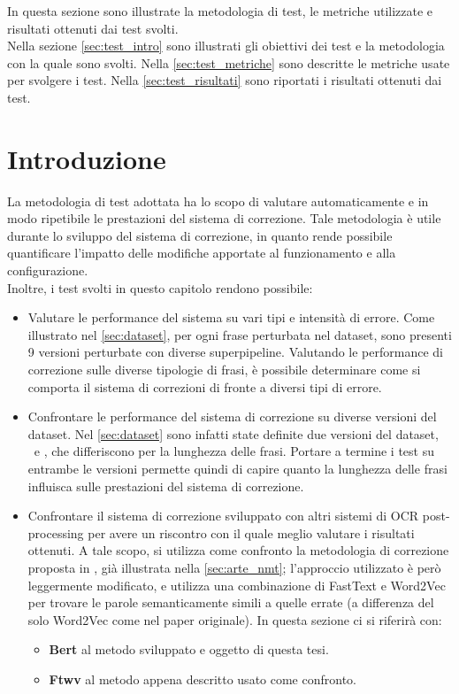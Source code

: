 In questa sezione sono illustrate la metodologia di test, le metriche utilizzate e risultati ottenuti dai test svolti.\\
Nella sezione \autoref{sec:test_intro} sono illustrati gli obiettivi dei test e la metodologia con la quale sono svolti. Nella \autoref{sec:test_metriche} sono descritte le metriche usate per svolgere i test. Nella \autoref{sec:test_risultati} sono riportati i risultati ottenuti dai test.

\section{Introduzione}
\label{sec:test_intro}
La metodologia di test adottata ha lo scopo di valutare automaticamente e in modo ripetibile le prestazioni del sistema di correzione. Tale metodologia è utile durante lo sviluppo del sistema di correzione, in quanto rende possibile quantificare l'impatto delle modifiche apportate al funzionamento e alla configurazione.\\
Inoltre, i test svolti in questo capitolo rendono possibile:
\begin{itemize}
\item Valutare le performance del sistema su vari tipi e intensità di errore. Come illustrato nel \autoref{sec:dataset}, per ogni frase perturbata nel dataset, sono presenti 9 versioni perturbate con diverse superpipeline. Valutando le performance di correzione sulle diverse tipologie di frasi, è possibile determinare come si comporta il sistema di correzioni di fronte a diversi tipi di errore.

\item Confrontare le performance del sistema di correzione su diverse versioni del dataset. Nel \autoref{sec:dataset} sono infatti state definite due versioni del dataset, \dsta\ e \dstb, che differiscono per la lunghezza delle frasi. Portare a termine i test su entrambe le versioni permette quindi di capire quanto la lunghezza delle frasi influisca sulle prestazioni del sistema di correzione.

\item Confrontare il sistema di correzione sviluppato con altri sistemi di OCR post-processing per avere un riscontro con il quale meglio valutare i risultati ottenuti. A tale scopo, si utilizza come confronto la metodologia di correzione proposta in \cite{hamalainen2019paft}, già illustrata nella \autoref{sec:arte_nmt}; l'approccio utilizzato è però leggermente modificato, e utilizza una combinazione di FastText e Word2Vec per trovare le parole semanticamente simili a quelle errate (a differenza del solo Word2Vec come nel paper originale). In questa sezione ci si riferirà con:
	\begin{itemize}
	\item \textbf{Bert} al metodo sviluppato e oggetto di questa tesi.
	\item \textbf{Ftwv} al metodo appena descritto usato come confronto.
	\end{itemize}

\end{itemize}

